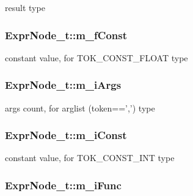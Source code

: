 result type 

\hypertarget{structExprNode__t_a45aa1e9aec7573e9bf1591ee57c8beb5}{
\subsubsection[{m\-\_\-f\-Const}]{ Expr\-Node\-\_\-t\-::m\-\_\-f\-Const}}\label{structExprNode__t_a45aa1e9aec7573e9bf1591ee57c8beb5}


constant value, for T\-O\-K\-\_\-\-C\-O\-N\-S\-T\-\_\-\-F\-L\-O\-A\-T type 

\hypertarget{structExprNode__t_a00c9790bdea60e3da05d5b67920a7f10}{
\subsubsection[{m\-\_\-i\-Args}]{ Expr\-Node\-\_\-t\-::m\-\_\-i\-Args}}\label{structExprNode__t_a00c9790bdea60e3da05d5b67920a7f10}


args count, for arglist (token==',') type 

\hypertarget{structExprNode__t_a7b2ded141635d07da15b515c01fff520}{
\subsubsection[{m\-\_\-i\-Const}]{ Expr\-Node\-\_\-t\-::m\-\_\-i\-Const}}\label{structExprNode__t_a7b2ded141635d07da15b515c01fff520}


constant value, for T\-O\-K\-\_\-\-C\-O\-N\-S\-T\-\_\-\-I\-N\-T type 

\hypertarget{structExprNode__t_a950d0840f6c2ccfdd28c7432411ca417}{
\subsubsection[{m\-\_\-i\-Func}]{ Expr\-Node\-\_\-t\-::m\-\_\-i\-Func}}\label{structExprNode__t_a950d0840f6c2ccfdd28c7432411ca417}


